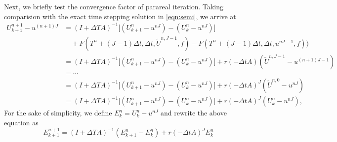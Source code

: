 \documentclass[a4paper, oneside]{book}
\begin{document}
Next, we briefly test the convergence factor of parareal iteration.
Taking comparision with the exact time stepping solution in \eqref{eqn:semi}, we arrive at
\begin{equation*}
\begin{aligned}
    U_{k+1}^{n+1} - u^{(n+1)J} &= (I+\Delta TA)^{-1}\Big[(U_{k+1}^{n} - u^{nJ})
- (U_{k}^{n} - u^{nJ})\Big] \\
& \quad + F(T^n+(J-1)\Delta t, \Delta t, \widetilde U^{n,J-1}, f)
- F(T^n+(J-1)\Delta t, \Delta t, u^{nJ-1}, f)) \\
&= (I+\Delta TA)^{-1}\Big[(U_{k+1}^{n} - u^{nJ})
- (U_{k}^{n} - u^{nJ})\Big]
+ r(-\Delta t A) (\widetilde U^{n,J-1}- u^{(n+1)J-1})\\
&=\cdots\\
&= (I+\Delta TA)^{-1}\Big[(U_{k+1}^{n} - u^{nJ})
- (U_{k}^{n} - u^{nJ})\Big]
+ r(-\Delta t A)^J (\widetilde U^{n,0}- u^{nJ})\\
&= (I+\Delta TA)^{-1}\Big[(U_{k+1}^{n} - u^{nJ})
- (U_{k}^{n} - u^{nJ})\Big]
+ r(-\Delta t A)^J ( U_k^{n}- u^{nJ}),
\end{aligned}
\end{equation*}
For the sake of simplicity, we define $E_{k}^{n} = U_k^n - u^{nJ}$ and rewrite the above equation as
$$E_{k+1}^{n+1} = (I+\Delta TA)^{-1} (E_{k+1}^n - E_{k}^{n})
+  r(-\Delta t A)^J E_{k}^{n}
$$
\end{document}
